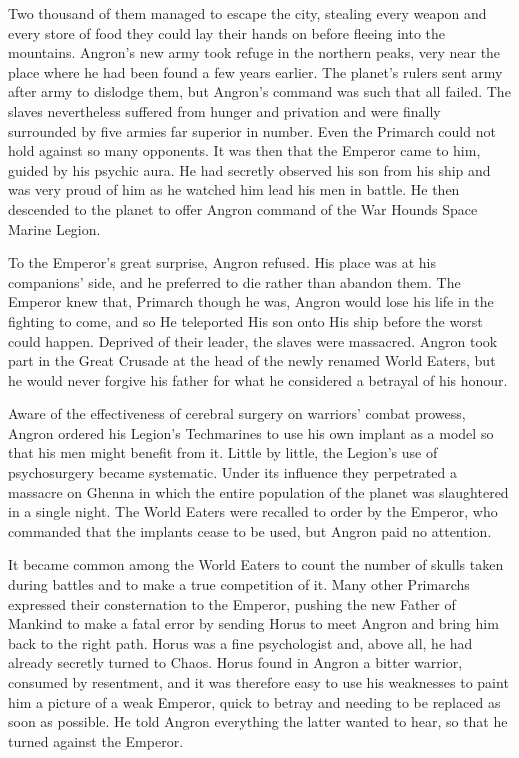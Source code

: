Two thousand of them managed to escape the city, stealing every weapon and every store of food they could lay their hands on before fleeing into the mountains. Angron's new army took refuge in the northern peaks, very near the place where he had been found a few years earlier. The planet's rulers sent army after army to dislodge them, but Angron's command was such that all failed. The slaves nevertheless suffered from hunger and privation and were finally surrounded by five armies far superior in number. Even the Primarch could not hold against so many opponents. It was then that the Emperor came to him, guided by his psychic aura. He had secretly observed his son from his ship and was very proud of him as he watched him lead his men in battle. He then descended to the planet to offer Angron command of the War Hounds Space Marine Legion.

To the Emperor's great surprise, Angron refused. His place was at his companions' side, and he preferred to die rather than abandon them. The Emperor knew that, Primarch though he was, Angron would lose his life in the fighting to come, and so He teleported His son onto His ship before the worst could happen. Deprived of their leader, the slaves were massacred. Angron took part in the Great Crusade at the head of the newly renamed World Eaters, but he would never forgive his father for what he considered a betrayal of his honour.

Aware of the effectiveness of cerebral surgery on warriors' combat prowess, Angron ordered his Legion's Techmarines to use his own implant as a model so that his men might benefit from it. Little by little, the Legion's use of psychosurgery became systematic. Under its influence they perpetrated a massacre on Ghenna in which the entire population of the planet was slaughtered in a single night. The World Eaters were recalled to order by the Emperor, who commanded that the implants cease to be used, but Angron paid no attention.

It became common among the World Eaters to count the number of skulls taken during battles and to make a true competition of it. Many other Primarchs expressed their consternation to the Emperor, pushing the new Father of Mankind to make a fatal error by sending Horus to meet Angron and bring him back to the right path. Horus was a fine psychologist and, above all, he had already secretly turned to Chaos. Horus found in Angron a bitter warrior, consumed by resentment, and it was therefore easy to use his weaknesses to paint him a picture of a weak Emperor, quick to betray and needing to be replaced as soon as possible. He told Angron everything the latter wanted to hear, so that he turned against the Emperor.

